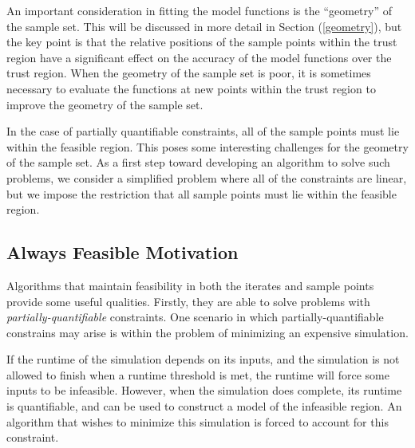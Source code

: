 \documentclass{article}
\theoremstyle{case}
\let\oldref\ref
\renewcommand{\ref}[1]{(\oldref{#1})}
\begin{document}
An important consideration in fitting the model functions is the ``geometry'' of the sample set.
This will be discussed in more detail in Section \ref{geometry}, but the key point is that the relative positions of the sample points within the trust region have a significant effect on the accuracy of the model functions over the trust region.
When the geometry of the sample set is poor, it is sometimes necessary to evaluate the functions at new points within the trust region to improve the geometry of the sample set.

In the case of partially quantifiable constraints, all of the sample points must lie within the feasible region.
This poses some interesting challenges for the geometry of the sample set.
As a first step toward developing an algorithm to solve such problems, we consider a simplified problem where all of the constraints are linear, but we impose the restriction that all sample points must lie within the feasible region.

  

\subsection{Always Feasible Motivation}

Algorithms that maintain feasibility in both the iterates and sample points provide some useful qualities.
Firstly, they are able to solve problems with \emph{partially-quantifiable} constraints.
One scenario in which partially-quantifiable constrains may arise is within the problem of minimizing an expensive simulation.


If the runtime of the simulation depends on its inputs, and the simulation is not allowed to finish when a runtime threshold is met, the runtime will force some inputs to be infeasible.
However, when the simulation does complete, its runtime is quantifiable, and can be used to construct a model of the infeasible region.
An algorithm that wishes to minimize this simulation is forced to account for this constraint.
\end{document}
